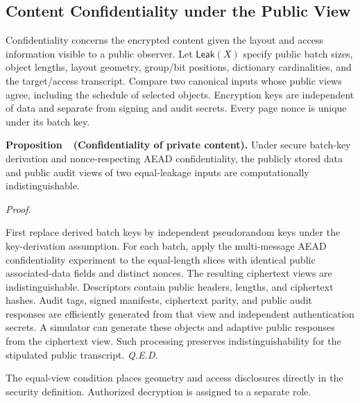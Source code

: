 \documentclass[10pt,journal]{IEEEtran}
\newcounter{proposition}
\newenvironment{proposition}[1]{%
  \refstepcounter{proposition}\par\smallskip\noindent
  \textbf{Proposition~\theproposition\ (#1). }\ignorespaces
}{\par\smallskip}
\newenvironment{claimproof}{\par\noindent\emph{Proof. }\ignorespaces
}{\hfill\textit{Q.E.D.}\par\smallskip}
\begin{document}
\subsection{Content Confidentiality under the Public View}\label{sec:confidentiality}
Confidentiality concerns the encrypted content given the layout and access
information visible to a public observer. Let $\mathsf{Leak}(X)$ specify public batch sizes, object lengths, layout
geometry, group/bit positions, dictionary cardinalities, and the target/access
transcript. Compare two canonical inputs whose public views agree, including
the schedule of selected objects. Encryption keys are independent of data
and separate from signing and audit secrets. Every page nonce is unique
under its batch key.

\begin{proposition}{Confidentiality of private content}\label{prop:confidentiality}
Under secure batch-key derivation and nonce-respecting AEAD confidentiality,
the publicly stored data and public audit views of two equal-leakage inputs are
computationally indistinguishable.
\end{proposition}
\begin{claimproof}
First replace derived batch keys by independent pseudorandom keys under
the key-derivation assumption. For each batch, apply the multi-message
AEAD confidentiality experiment to the equal-length slices with identical
public associated-data fields and distinct nonces. The resulting ciphertext
views are indistinguishable. Descriptors contain public headers, lengths,
and ciphertext hashes. Audit tags, signed manifests, ciphertext parity,
and public audit responses are efficiently generated from that view and
independent authentication secrets. A simulator can generate these objects
and adaptive public responses from the ciphertext view. Such processing
preserves indistinguishability for the stipulated public transcript.
\end{claimproof}
The equal-view condition places geometry and access disclosures directly in
the security definition. Authorized decryption is assigned to a separate role.
\end{document}
